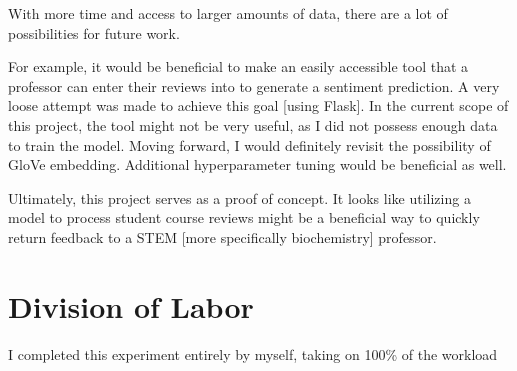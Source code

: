 \documentclass[11pt,a4paper]{article}
\begin{document}
With more time and access to larger amounts of data, there are a lot of possibilities for future work.

For example, it would be beneficial to make an easily accessible tool that a professor can enter their reviews into to generate a sentiment prediction. A very loose attempt was made to achieve this goal [using Flask]. In the current scope of this project, the tool might not be very useful, as I did not possess enough data to train the model. Moving forward, I would definitely revisit the possibility of GloVe embedding. Additional hyperparameter tuning would be beneficial as well.

Ultimately, this project serves as a proof of concept. It looks like utilizing a model to process student course reviews might be a beneficial way to quickly return feedback to a STEM [more specifically biochemistry] professor.



\section{Division of Labor}

I completed this experiment entirely by myself, taking on 100\% of the workload





\end{document}
